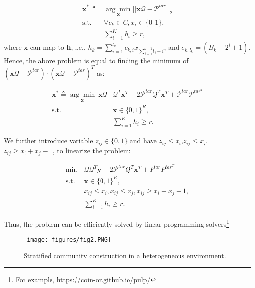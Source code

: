 \documentclass[lettersize,journal]{IEEEtran}
\begin{document}
\begin{equation}
\begin{aligned}
\mathbf{x}^*\triangleq &\underset{\mathbf{x}}{\arg \min} \vert\vert \mathbf{x}\mathcal{Q}-\mathcal{P}^{tar}\vert\vert_2 \\
\text{s.t. } &\forall c_k \in C, x_i\in\{0,1\}, \\
&\sum_{i=1} ^K h_i\geq r,
\end{aligned}
\end{equation} 
where $\mathbf{x}$ can map to $\mathbf{h}$, i.e., $h_k = \sum _{i=1} ^{l_k} e_{k,i}x_{\sum_{j=1}^{k-1} l_j +i}$, and $e_{k,l_k}=(B_k-2^i+1)$. Hence, the above problem is equal to finding the minimum of $(\mathbf{x}\mathcal{Q}-\mathcal{P}^{tar})\cdot (\mathbf{x}\mathcal{Q}-\mathcal{P}^{tar})^T$ as:

\begin{equation}
\begin{aligned}
\mathbf{x}^*\triangleq\underset{\mathbf{x}}{\arg \min}\ \mathbf{x}\mathcal{Q} &\mathcal{Q}^T\mathbf{x}^T-2\mathcal{P}^{tar}Q^T\mathbf{x}^T+\mathcal{P}^{tar}\mathcal{P}^{tar^T}\\
\text{s.t. }&\mathbf{x}\in\{0,1\}^R,\\
&\sum_{i=1} ^K h_i\geq r.
\end{aligned}
\end{equation}

We further introduce variable $z_{ij} \in \{0,1\}$ and have $z_{ij}\leq x_i$,$z_{ij}\leq x_j$,$z_{ij}\geq x_i+x_j-1$, to linearize the problem:

\begin{equation}%
\begin{aligned}
\min\ &\mathcal{Q}\mathcal{Q}^T\mathbf{y}-2\mathcal{P}^{tar}Q^T\mathbf{x}^T+P^{tar}P^{tar^T}\\
\text{s.t. }& \mathbf{x}\in\{0,1\}^R,
\\
&x_{ij}\leq x_i, x_{ij}\leq x_j, x_{ij}\geq x_i+x_j-1,
\\&\sum_{i=1} ^K h_i\geq r.
\end{aligned}
\end{equation}

Thus, the problem can be efficiently solved by linear programming solvers\footnote{For example, https://coin-or.github.io/pulp/}. 

\begin{figure}[!t]
\centering
\texttt{[image: figures/fig2.PNG]}
\caption{Stratified community construction in a heterogeneous environment.}
\label{fig2:framework}
\end{figure}
\end{document}
